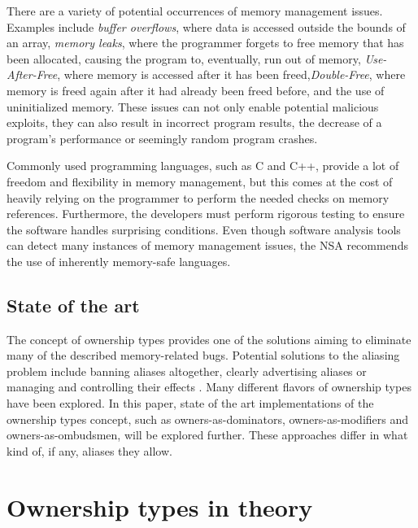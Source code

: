 \documentclass[sigplan,11pt,nonacm]{acmart}
\begin{document}
There are a variety of potential occurrences of memory management issues.
Examples include \emph{buffer overflows}, where data is accessed outside the bounds of an array, \emph{memory leaks}, where the programmer forgets to free memory that has been allocated, causing the program to, eventually, run out of memory, \emph{Use-After-Free}, where memory is accessed after it has been freed,\emph{Double-Free}, where memory is freed again after it had already been freed before, and the use of uninitialized memory.
These issues can not only enable potential malicious exploits, they can also result in incorrect program results, the decrease of a program's performance or seemingly random program crashes.

Commonly used programming languages, such as C and C++, provide a lot of freedom and flexibility in memory management, but this comes at the cost of heavily relying on the programmer to perform the needed checks on memory references.
Furthermore, the developers must perform rigorous testing to ensure the software handles surprising conditions.
Even though software analysis tools can detect many instances of memory management issues, the NSA recommends the use of inherently memory-safe languages.


\subsection{State of the art}
\label{sec:state-of-the-art}


The concept of ownership types provides one of the solutions aiming to eliminate many of the described memory-related bugs.
Potential solutions to the aliasing problem include banning aliases altogether, clearly advertising aliases or managing and controlling their effects \cite{ownership-types-survey}.
Many different flavors of ownership types have been explored.
In this paper, state of the art implementations of the ownership types concept, such as owners-as-dominators, owners-as-modifiers and owners-as-ombudsmen, will be explored further.
These approaches differ in what kind of, if any, aliases they allow.



\section{Ownership types in theory}
\label{sec:theory}
\end{document}
